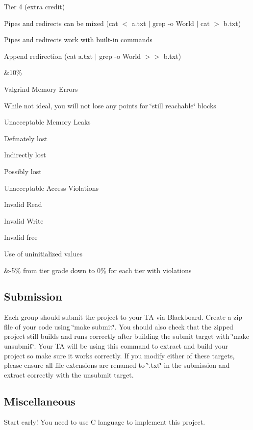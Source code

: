 \begin{longtabu}
\begin{DoxyItemize}
\item Tier 4 (extra credit)  
\begin{DoxyItemize}
\item Pipes and redirects can be mixed (cat $<$ a.\+txt $|$ grep -\/o World $|$ cat $>$ b.\+txt)  
\item Pipes and redirects work with built-\/in commands  
\item Append redirection (cat a.\+txt $|$ grep -\/o World $>$$>$ b.\+txt)  
\end{DoxyItemize}
\end{DoxyItemize}&10\%   \\

\begin{DoxyItemize}
\item Valgrind Memory Errors  
\begin{DoxyItemize}
\item While not ideal, you will not lose any points for \char`\"{}still reachable\char`\"{} blocks  
\item Unacceptable Memory Leaks  
\begin{DoxyItemize}
\item Definately lost  
\item Indirectly lost  
\item Possibly lost  
\end{DoxyItemize}
\item Unacceptable Access Violations  
\begin{DoxyItemize}
\item Invalid Read  
\item Invalid Write  
\item Invalid free  
\item Use of uninitialized values  
\end{DoxyItemize}
\end{DoxyItemize}
\end{DoxyItemize}&-\/5\% from tier grade down to 0\% for each tier with violations   \\
\end{longtabu}


\subsection*{Submission}

Each group should submit the project to your TA via Blackboard. Create a zip file of your code using \char`\"{}make submit\char`\"{}. You should also check that the zipped project still builds and runs correctly after building the submit target with \char`\"{}make unsubmit\char`\"{}. Your TA will be using this command to extract and build your project so make sure it works correctly. If you modify either of these targets, please ensure all file extensions are renamed to \char`\"{}.\+txt\char`\"{} in the submission and extract correctly with the unsubmit target.

\subsection*{Miscellaneous}

Start early! You need to use C language to implement this project. 